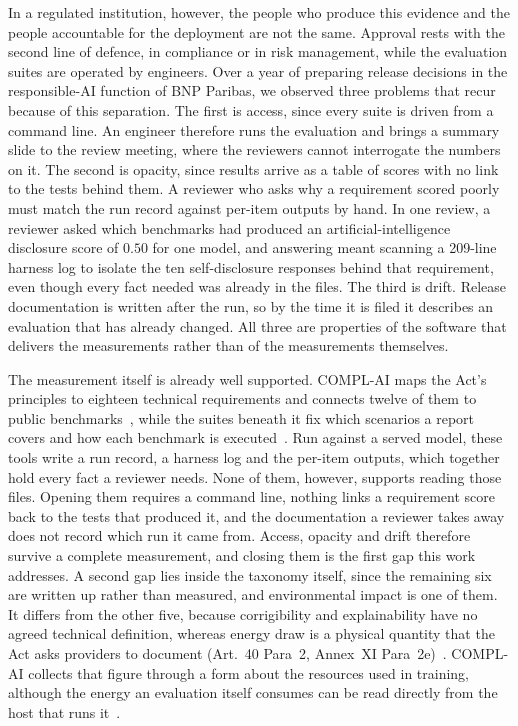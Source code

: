 \documentclass[10pt,conference]{IEEEtran}
\begin{document}
In a regulated institution, however, the people who produce this evidence and the people accountable for the deployment are not the same.
Approval rests with the second line of defence, in compliance or in risk management, while the evaluation suites are operated by engineers.
Over a year of preparing release decisions in the responsible-AI function of BNP Paribas, we observed three problems that recur because of this separation.
The first is access, since every suite is driven from a command line.
An engineer therefore runs the evaluation and brings a summary slide to the review meeting, where the reviewers cannot interrogate the numbers on it.
The second is opacity, since results arrive as a table of scores with no link to the tests behind them.
A reviewer who asks why a requirement scored poorly must match the run record against per-item outputs by hand.
In one review, a reviewer asked which benchmarks had produced an artificial-intelligence disclosure score of $0.50$ for one model, and answering meant scanning a 209-line harness log to isolate the ten self-disclosure responses behind that requirement, even though every fact needed was already in the files.
The third is drift.
Release documentation is written after the run, so by the time it is filed it describes an evaluation that has already changed.
All three are properties of the software that delivers the measurements rather than of the measurements themselves.

The measurement itself is already well supported.
COMPL-AI maps the Act's principles to eighteen technical requirements and connects twelve of them to public benchmarks~\cite{guldimann2024complai}, while the suites beneath it fix which scenarios a report covers and how each benchmark is executed~\cite{liang2023helm,gao2021lmevalharness,derczynski2024garak,wang2023decodingtrust}.
Run against a served model, these tools write a run record, a harness log and the per-item outputs, which together hold every fact a reviewer needs.
None of them, however, supports reading those files.
Opening them requires a command line, nothing links a requirement score back to the tests that produced it, and the documentation a reviewer takes away does not record which run it came from.
Access, opacity and drift therefore survive a complete measurement, and closing them is the first gap this work addresses.
A second gap lies inside the taxonomy itself, since the remaining six are written up rather than measured, and environmental impact is one of them.
It differs from the other five, because corrigibility and explainability have no agreed technical definition, whereas energy draw is a physical quantity that the Act asks providers to document (Art.~40 Para~2, Annex~XI Para~2e)~\cite{euaiact2024}.
COMPL-AI collects that figure through a form about the resources used in training, although the energy an evaluation itself consumes can be read directly from the host that runs it~\cite{rajput2024fecom}.
\end{document}
